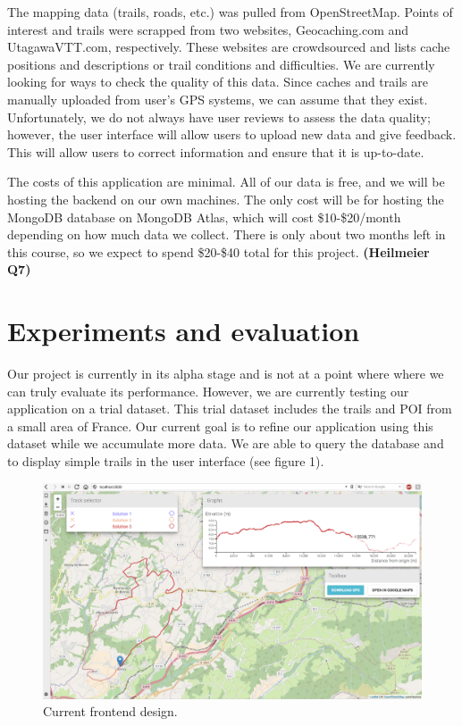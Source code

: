 \documentclass[sigconf]{acmart}
\begin{document}
The mapping data (trails, roads, etc.) was pulled from OpenStreetMap. Points of interest  and trails were scrapped from two websites, Geocaching.com and UtagawaVTT.com, respectively. These websites are crowdsourced and lists cache positions and descriptions or trail conditions and difficulties. We are currently looking for ways to check the quality of this data. Since caches and trails are manually uploaded from user's GPS systems, we can assume that they exist. Unfortunately, we do not always have user reviews to assess the data quality; however, the user interface will allow users to upload new data and give feedback. This will allow users to correct information and ensure that it is up-to-date.

The costs of this application are minimal. All of our data is free, and we will be hosting the backend on our own machines. The only cost will be for hosting the MongoDB database on MongoDB Atlas, which will cost \$10-\$20/month depending on how much data we collect. There is only about two months left in this course, so we expect to spend \$20-\$40 total for this project. \textbf{(Heilmeier Q7)}

\section{Experiments and evaluation}
Our project is currently in its alpha stage and is not at a point where where we can truly evaluate its performance. However, we are currently testing our application on a trial dataset. This trial dataset includes the trails and POI from a small area of France. Our current goal is to refine our application using this dataset while we accumulate more data. We are able to query the database and to display simple trails in the user interface (see figure 1).

\begin{figure}
\includegraphics[scale=0.3]{current_frontend.png}
\caption{Current frontend design.}
\end{figure}
\end{document}
